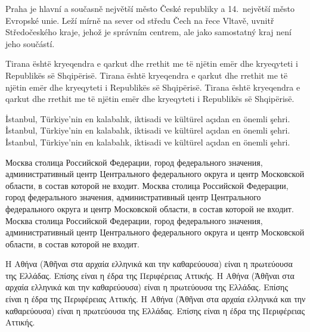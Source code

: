 \documentclass{homework}
\begin{document}
		Praha je hlavní a současně největší město České republiky a 14.~největší město Evropské unie. Leží mírně na sever od středu Čech na řece Vltavě, uvnitř Středočeského kraje, jehož je správním centrem, ale jako samostatný kraj není jeho součástí.

		Tirana është kryeqendra e qarkut dhe rrethit me të njëtin emër dhe kryeqyteti i Republikës së Shqipërisë. Tirana është kryeqendra e qarkut dhe rrethit me të njëtin emër dhe kryeqyteti i Republikës së Shqipërisë. Tirana është kryeqendra e qarkut dhe rrethit me të njëtin emër dhe kryeqyteti i Republikës së Shqipërisë.

		İstanbul, Türkiye'nin en kalabalık, iktisadi ve kültürel açıdan en önemli şehri. İstanbul, Türkiye'nin en kalabalık, iktisadi ve kültürel açıdan en önemli şehri. İstanbul, Türkiye'nin en kalabalık, iktisadi ve kültürel açıdan en önemli şehri.

		Москва столица Российской Федерации, город федерального значения, административный центр Центрального федерального округа и центр Московской области, в состав которой не входит. Москва столица Российской Федерации, город федерального значения, административный центр Центрального федерального округа и центр Московской области, в состав которой не входит. Москва столица Российской Федерации, город федерального значения, административный центр Центрального федерального округа и центр Московской области, в состав которой не входит.

		Η Αθήνα (Ἀθῆναι στα αρχαία ελληνικά και την καθαρεύουσα) είναι η πρωτεύουσα της Ελλάδας. Επίσης είναι η έδρα της Περιφέρειας Αττικής. Η Αθήνα (Ἀθῆναι στα αρχαία ελληνικά και την καθαρεύουσα) είναι η πρωτεύουσα της Ελλάδας. Επίσης είναι η έδρα της Περιφέρειας Αττικής. Η Αθήνα (Ἀθῆναι στα αρχαία ελληνικά και την καθαρεύουσα) είναι η πρωτεύουσα της Ελλάδας. Επίσης είναι η έδρα της Περιφέρειας Αττικής.
	
\end{document}
